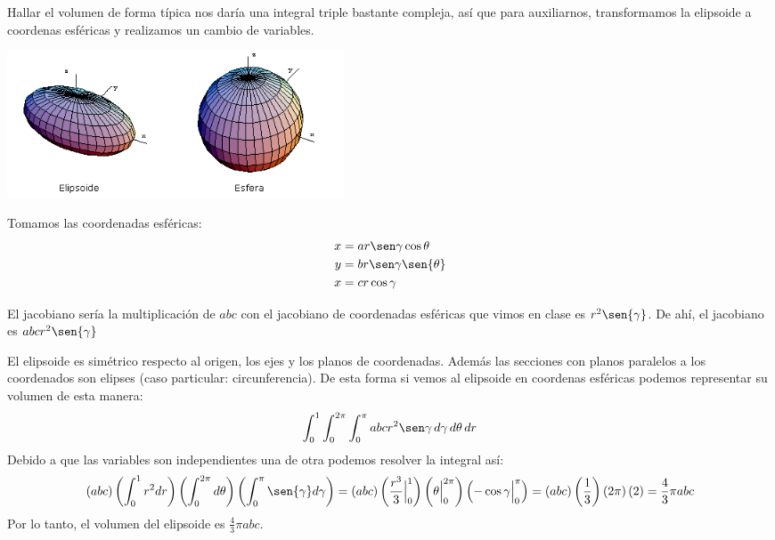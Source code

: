 \documentclass{article}
\begin{document}
\begin{enumerate}
{            \color{azul}
            Hallar el volumen de forma típica nos daría una integral triple
            bastante compleja, así que para auxiliarnos, transformamos la
            elipsoide a coordenas esféricas y realizamos un cambio de variables.
            \begin{center}
                \includegraphics[width=10cm]{img/elipsoide.png}
        	\end{center}
            Tomamos las coordenadas esféricas:
            \begin{align*}
                x &= ar\sen\gamma\cos{\theta}\\
                y &= br\sen\gamma\sen{\theta}\\
                x &= cr\cos\gamma
            \end{align*}

            El jacobiano sería la multiplicación de $abc$ con el jacobiano de
            coordenadas esféricas que vimos en clase es $r^2\sen{\gamma}$. De
            ahí, el jacobiano es $abcr^2\sen{\gamma}$

            El elipsoide es simétrico respecto al origen, los ejes y los planos
            de coordenadas. Además las secciones con planos paralelos a los
            coordenados son elipses (caso particular: circunferencia). De esta
            forma si vemos al elipsoide en coordenas esféricas podemos
            representar su volumen de esta manera:
        	\[
                \int_{0}^{1}{
                    \int_{0}^{2\pi}{
                        \int_{0}^{\pi}{
                            abcr^2\sen\gamma
                        \,d\gamma}
                    \,d\theta}
                \,dr}
            \]
            Debido a que las variables son independientes una de otra podemos
            resolver la integral así:
            \[
                (abc)
                \left(\int_{0}^{1}r^2 dr\right)
                \left(\int_{0}^{2\pi} d\theta\right)
                \left(\int_{0}^{\pi}\sen{\gamma} d\gamma\right)
                =
                (abc)
                \left(\frac{r^3}{3}\Big|_0^1\right)
                \left(\theta\Big|_0^{2\pi}\right)
                \left(-\cos{\gamma}\Big|_0^{\pi}\right)
                =
                (abc)\left(\frac{1}{3}\right)
                \left(2\pi\right)(2)
                =
                \frac{4}{3}\pi abc
            \]
            Por lo tanto, el volumen del elipsoide es
            $\displaystyle \frac{4}{3}\pi abc$.
        }


\end{enumerate}
\end{document}
